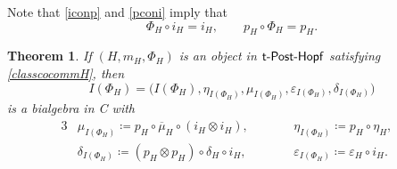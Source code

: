 \documentclass[10pt,a4paper]{amsart}
\numberwithin{equation}{section}
\newtheorem{Theorem}{Theorem}[section]
\begin{document}
Note that \eqref{iconp} and \eqref{pconi} imply that
\begin{equation}\label{Phiconi}
\Phi_{H}\circ i_{H}=i_{H},\qquad p_{H}\circ \Phi_{H}=p_{H}.
\end{equation}
\begin{Theorem}\label{bialgIphi}
If $(H,m_{H},\Phi_{H})$ is an object in ${\sf t}\textnormal{-}\sf{Post}\textnormal{-}\sf{Hopf}$ satisfying \eqref{classcocommH}, then \[I(\Phi_{H})=\bigl(I(\Phi_{H}),\eta_{I(\Phi_{H})},\mu_{I(\Phi_{H})},\varepsilon_{I(\Phi_{H})},\delta_{I(\Phi_{H})}\bigr)\] is a bialgebra in {\sf C} with
\begin{alignat*}{3}
&\mu_{I(\Phi_{H})}\coloneqq p_{H}\circ\overline{\mu}_{H}\circ (i_{H}\otimes i_{H}),\qquad&&
\eta_{I(\Phi_{H})}\coloneqq p_{H}\circ \eta_{H},\\
&\delta_{I(\Phi_{H})}\coloneqq (p_{H}\otimes p_{H})\circ\delta_{H}\circ i_{H},\qquad&&
\varepsilon_{I(\Phi_{H})}\coloneqq \varepsilon_{H}\circ i_{H}.&
\end{alignat*}
\end{Theorem}
\end{document}
